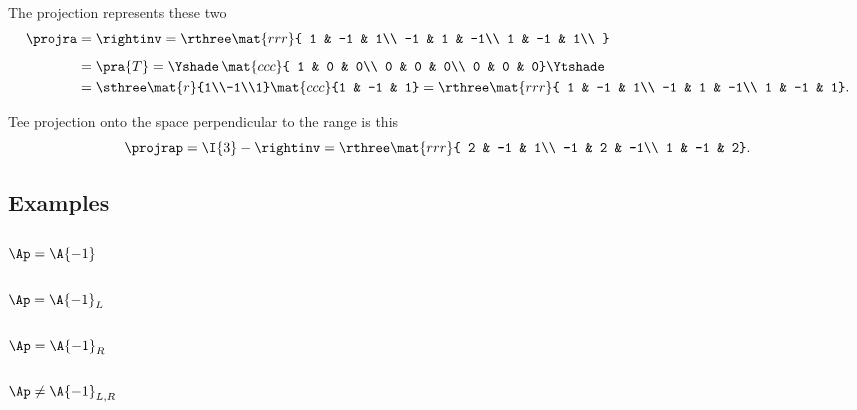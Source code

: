 The projection represents these two 
\begin{equation}
  \begin{split}
    \projra &= \rightinv = \rthree
    \mat{rrr}
    { 
    1 & -1 &  1\\
   -1 &  1 & -1\\
    1 & -1 &  1\\
    }\\[5pt]
    & = \pra{T} =
    \Yshade\,
    \mat{ccc}{
    1 & 0 & 0\\
    0 & 0 & 0\\
    0 & 0 & 0}
    \Ytshade\\
    & =\sthree
    \mat{r}
    {1\\-1\\1}
    \mat{ccc}
    {1 & -1 & 1}
    = \rthree\mat{rrr}
    { 1 & -1 &  1\\
     -1 &  1 & -1\\
      1 & -1 &  1}.
  \end{split}
\end{equation}

Tee projection onto the space perpendicular to the range is this
\begin{equation}
  \projrap = \I{3} - \rightinv = \rthree
    \mat{rrr}
    { 2 & -1 &  1\\
     -1 &  2 & -1\\
      1 & -1 &  2}.
\end{equation}


\subsection{Examples}

\subsubsection{$\Ap=\A{-1}$}

\subsubsection{$\Ap=\A{-1}_{L}$}

\subsubsection{$\Ap=\A{-1}_{R}$}

\subsubsection{$\Ap\ne\A{-1}_{L,R}$}




	
\endinput